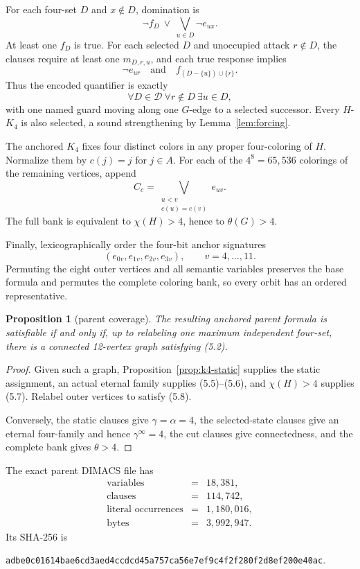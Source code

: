 \documentclass[11pt]{article}
\newtheorem{proposition}[theorem]{Proposition}
\theoremstyle{definition}
\theoremstyle{remark}
\newcommand{\gaminf}{\gamma^{\infty}}
\newcommand{\filehash}[1]{\nolinkurl{#1}}
\begin{document}
For each four-set \(D\) and \(x\notin D\), domination is
\[
  \neg f_D\ \vee\ \bigvee_{u\in D}\neg e_{ux}.
\tag{5.5}
\]
At least one \(f_D\) is true.  For each selected \(D\) and unoccupied
attack \(r\notin D\), the clauses require at least one \(m_{D,r,u}\), and
each true response implies
\[
  \neg e_{ur}
  \quad\text{and}\quad
  f_{(D-\{u\})\cup\{r\}}.
\tag{5.6}
\]
Thus the encoded quantifier is exactly
\[
  \forall D\in\mathcal D\ \forall r\notin D\ \exists u\in D,
\]
with one named guard moving along one \(G\)-edge to a selected successor.
Every \(H\)-\(K_4\) is also selected, a sound strengthening by
Lemma~\ref{lem:forcing}.

The anchored \(K_4\) fixes four distinct colors in any proper
four-coloring of \(H\).  Normalize them by \(c(j)=j\) for \(j\in A\).
For each of the \(4^8=65,536\) colorings of the remaining vertices, append
\[
  C_c=\bigvee_{\substack{u<v\\c(u)=c(v)}}e_{uv}.
\tag{5.7}
\]
The full bank is equivalent to \(\chi(H)>4\), hence to \(\theta(G)>4\).

Finally, lexicographically order the four-bit anchor signatures
\[
  (e_{0v},e_{1v},e_{2v},e_{3v}),\qquad v=4,\ldots,11.
\tag{5.8}
\]
Permuting the eight outer vertices and all semantic variables preserves
the base formula and permutes the complete coloring bank, so every orbit
has an ordered representative.

\begin{proposition}[parent coverage]\label{prop:k4-parent}
The resulting anchored parent formula is satisfiable if and only if, up to
relabeling one maximum independent four-set, there is a connected
12-vertex graph satisfying (5.2).
\end{proposition}

\begin{proof}
Given such a graph, Proposition~\ref{prop:k4-static} supplies the static
assignment, an actual eternal family supplies (5.5)--(5.6), and
\(\chi(H)>4\) supplies (5.7).  Relabel outer vertices to satisfy (5.8).

Conversely, the static clauses give \(\gamma=\alpha=4\), the selected-state
clauses give an eternal four-family and hence \(\gaminf=4\), the cut
clauses give connectedness, and the complete bank gives \(\theta>4\).
\end{proof}

The exact parent DIMACS file has
\[
\begin{array}{rcl}
\text{variables}&=&18,381,\\
\text{clauses}&=&114,742,\\
\text{literal occurrences}&=&1,180,016,\\
\text{bytes}&=&3,992,947.
\end{array}
\tag{5.9}
\]
Its SHA-256 is
\begin{center}
\filehash{adbe0c01614bae6cd3aed4ccdcd45a757ca56e7ef9c4f2f280f2d8ef200e40ac}.
\end{center}
\end{document}

